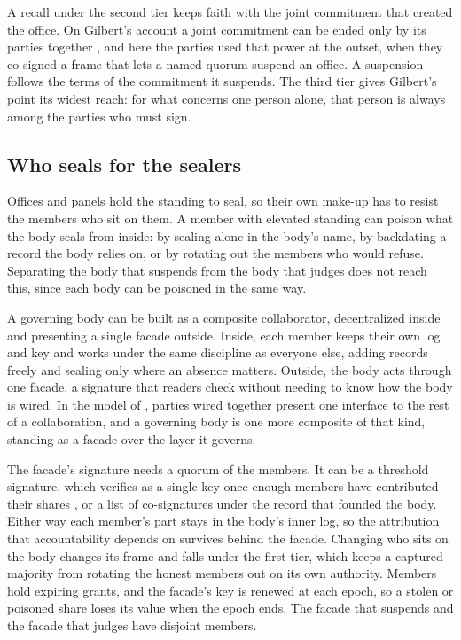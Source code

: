 A recall under the second tier keeps faith with the joint commitment that created the office. On
Gilbert's account a joint commitment can be ended only by its parties together
\citep{gilbert1990,gilbert2013}, and here the parties used that power at the outset, when they
co-signed a frame that lets a named quorum suspend an office. A suspension follows the terms of the
commitment it suspends. The third tier gives Gilbert's point its widest reach: for what concerns one
person alone, that person is always among the parties who must sign.

\subsection{Who seals for the sealers}\label{sec:sealers}

Offices and panels hold the standing to seal, so their own make-up has to resist the members who
sit on them. A member with elevated standing can poison what the body seals from inside: by sealing
alone in the body's name, by backdating a record the body relies on, or by rotating out the members
who would refuse. Separating the body that suspends from the body that judges does not reach this,
since each body can be poisoned in the same way.

A governing body can be built as a composite collaborator, decentralized inside and presenting a
single facade outside. Inside, each member keeps their own log and key and works under the same
discipline as everyone else, adding records freely and sealing only where an absence matters.
Outside, the body acts through one facade, a signature that readers check without needing to know
how the body is wired. In the model of \citet{karna2026}, parties wired together present one
interface to the rest of a collaboration, and a governing body is one more composite of that kind,
standing as a facade over the layer it governs.

The facade's signature needs a quorum of the members. It can be a threshold signature, which
verifies as a single key once enough members have contributed their shares \citep{rfc9591}, or a
list of co-signatures under the record that founded the body. Either way each member's part stays
in the body's inner log, so the attribution that accountability depends on survives behind the
facade. Changing who sits on the body changes its frame and falls under the first tier, which keeps
a captured majority from rotating the honest members out on its own authority. Members hold
expiring grants, and the facade's key is renewed at each epoch, so a stolen or poisoned share loses
its value when the epoch ends. The facade that suspends and the facade that judges have disjoint
members.

